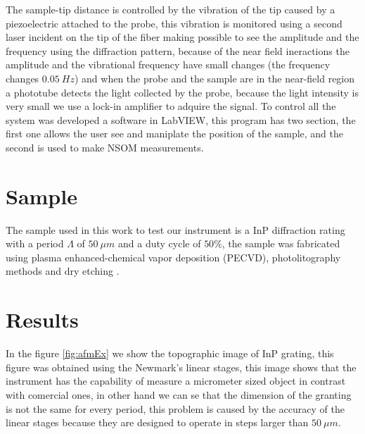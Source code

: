 \documentclass[reprint,aps,prb,citeautoscript,altaffilletter]{revtex4-2}
\begin{document}
	\par The sample-tip distance is controlled by the vibration of the tip caused by a piezoelectric attached to the probe, this vibration is monitored  using a second laser incident on the tip of the fiber making possible to see the amplitude and the frequency using the diffraction pattern, because of the near field ineractions the amplitude and  the vibrational frequency have small changes (the frequency changes $0.05 ~Hz$) and when the probe and the sample are in the near-field region
	 a phototube detects the light collected by the probe, because the light intensity is very small we use a lock-in  amplifier to adquire the signal.
	To control all the system was developed a software in LabVIEW, this program has two section, the first one allows the user see and maniplate the position of the sample, and the second is used to make NSOM measurements.

	\section{Sample} \label{samp}

	The sample used in this work to test our instrument is a InP diffraction rating with a period $\Lambda$ of $50~\mu m$ and a duty cycle of $50 \% $, the sample was fabricated using plasma enhanced-chemical vapor deposition (PECVD), photolitography methods and dry etching \cite{Panah:16} .

	\section{Results} \label{res}

	In the figure \ref{fig:afmEx} we show the topographic image of InP grating, this figure was obtained using the Newmark's linear stages, 
	this image shows that the instrument has the capability of measure a micrometer sized object in contrast with comercial ones, in other hand
	we can se that the dimension of the granting is not the same for every period, this problem is caused by the accuracy of the linear stages because they
	are designed to operate in steps larger than $50~\mu m$.
	
\end{document}
